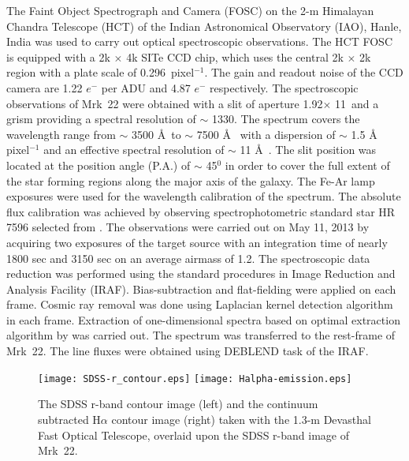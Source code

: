 \documentclass[useAMS,usenatbib]{mn2e}
\begin{document}
The Faint Object Spectrograph and Camera (FOSC) on the 2-m Himalayan Chandra Telescope (HCT) of the Indian Astronomical Observatory (IAO), Hanle, India was used to carry out optical spectroscopic observations. The HCT FOSC is equipped with a 2k $\times$ 4k SITe CCD chip, which uses the central 2k $\times$ 2k region with a plate scale of 0.296\arcsec~pixel$^{-1}$. The gain and readout noise of the CCD camera are 1.22 $e^{-}$ per ADU and 4.87 $e^{-}$ respectively. The spectroscopic observations of Mrk~22 were obtained with a slit of aperture 1.92\arcsec $\times$ 11\arcmin~and a grism providing a spectral resolution of $\sim$ 1330. The spectrum covers the wavelength range from $\sim$ 3500 \AA~to $\sim$ 7500 \AA~ with a dispersion of $\sim$ 1.5 \AA~ pixel$^{-1}$ and an effective spectral resolution of $\sim$ 11 \AA~. The slit position was located at the position angle (P.A.) of $\sim$ 45$^{\mathrm 0}$ in order to cover the full extent of the star forming regions along the major axis of the galaxy. The Fe-Ar lamp exposures  were used for the wavelength calibration of the spectrum. The absolute flux calibration was achieved by observing spectrophotometric standard star HR 7596 selected from \citet{1990AJ.....99.1621O}. The observations were carried out on May 11, 2013 by acquiring two exposures of the target source with an integration time of nearly 1800 sec and 3150 sec on an average airmass of 1.2. The spectroscopic data reduction was performed using the standard procedures in Image Reduction and Analysis Facility {\small (IRAF)}. Bias-subtraction and flat-fielding were applied on each frame. Cosmic ray removal was done using Laplacian kernel detection algorithm \citep{2001PASP..113.1420V} in each frame. Extraction of one-dimensional spectra based on optimal extraction algorithm by \citet{1986PASP...98..609H} was carried out. The spectrum was transferred to the rest-frame of Mrk~22. The line fluxes were obtained using {\small DEBLEND} task of the {\small IRAF}.

\begin{figure*}
\centering
\texttt{[image: SDSS-r\_contour.eps]}
\texttt{[image: Halpha-emission.eps]}
\caption{The SDSS r-band contour image (left) and the continuum subtracted H$\alpha$ contour image (right) taken with the 1.3-m Devasthal Fast Optical Telescope, overlaid upon the SDSS r-band image of Mrk~22.}
\label{fig:01}
\end{figure*}
\end{document}
